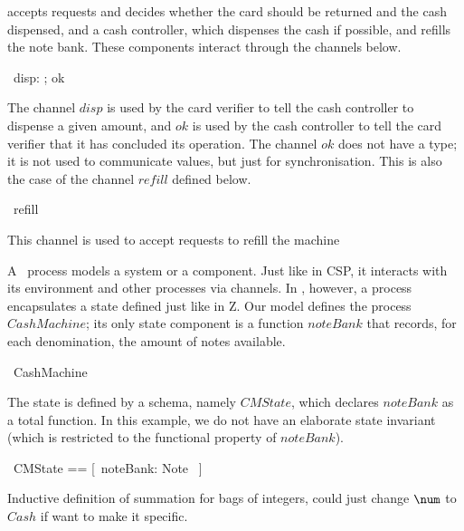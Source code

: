 \documentclass{article}
\begin{document}
accepts requests and decides whether the card should be returned and
the cash dispensed, and a cash controller, which dispenses the cash
if possible, and refills the note bank. These components interact
through the channels below.
\begin{circus}
  \circchannel\ disp: \nat; ok
\end{circus}
The channel $disp$ is used by the card verifier to tell the cash
controller to dispense a given amount, and $ok$ is used by the cash
controller to tell the card verifier that it has concluded its
operation. The channel $ok$ does not have a type; it is not used to
communicate values, but just for synchronisation.  This is also the
case of the channel $refill$ defined below.
\begin{circus}
  \circchannel\ refill
\end{circus}
This channel is used to accept requests to refill the machine

A \Circus\ process models a system or a component.  Just like in CSP,
it interacts with its environment and other processes via channels.
In \Circus, however, a process encapsulates a state defined just like
in Z.  Our model defines the process $CashMachine$; its only state
component is a function $noteBank$ that records, for each
denomination, the amount of notes available.
\begin{circus}
  \circprocess\ CashMachine \circdef \circbegin
\end{circus}
The state is defined by a schema, namely $CMState$, which declares
$noteBank$ as a total function.  In this example, we do not have an
elaborate state invariant (which is restricted to the functional
property of $noteBank$).
\begin{circusaction}
  \circstate\ CMState == [~noteBank: Note \fun \nat~]
\end{circusaction}

Inductive definition of summation for bags of integers,
could just change $\num$ to $Cash$ if want to make it specific.
%
\end{document}
